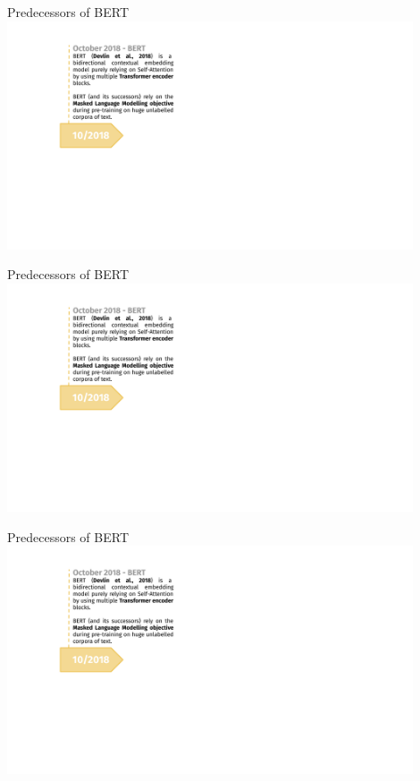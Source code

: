 \begin{vbframe}{Predecessors of BERT}
\hbox{\hspace{-3em} \includegraphics[width=12cm,page=1]{figure/transfer_learning_timeline2_nlp.pdf}}
\end{vbframe}
\begin{vbframe}{Predecessors of BERT}
\hbox{\hspace{-3em} \includegraphics[width=12cm,page=2]{figure/transfer_learning_timeline2_nlp.pdf}}
\end{vbframe}
\begin{vbframe}{Predecessors of BERT}
\hbox{\hspace{-3em} \includegraphics[width=12cm,page=3]{figure/transfer_learning_timeline2_nlp.pdf}}
\end{vbframe}
